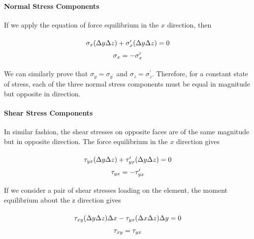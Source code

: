 \documentclass[
10pt,
a4paper,
openany,
svgnames,
]{book} %
\begin{document}
\paragraph{Normal Stress Components}

If we apply the equation of force equilibrium in the $x$ direction, then

\begin{equation}
  \arraycolsep=1.4pt\def\arraystretch{1.5}
  \begin{array}{c}
    \sigma_x(\Delta y\Delta z) + \sigma_x^\prime(\Delta y\Delta z) = 0\\
    \sigma_x =  - \sigma_x^\prime
  \end{array}
\end{equation}

We can similarly prove that $\sigma_y = \sigma_{y ^\prime}$ and $\sigma_z = \sigma_z ^\prime$. Therefore, for a constant state of stress, each of the three normal stress components must be equal in magnitude but opposite in direction.

\paragraph{Shear Stress Components}

In similar fashion, the shear stresses on opposite faces are of the same magnitude but in opposite direction.
The force equilibrium in the $x$ direction gives

\begin{equation}
  \arraycolsep=1.4pt\def\arraystretch{1.5}
  \begin{array}{c}
    {\tau _{yx}}(\Delta y\Delta z) + {\tau_{yx}^\prime}(\Delta y\Delta z) = 0\\
    {\tau _{yx}} =  - {\tau_{yx}^\prime}
  \end{array}
\end{equation}

If we consider a pair of shear stresses loading on the element, the moment equilibrium about the z direction gives

\begin{equation}
  \arraycolsep=1.4pt\def\arraystretch{1.5}
  \begin{array}{c}
    {\tau _{xy}}(\Delta y\Delta z)\Delta x - {\tau _{yx}}(\Delta x\Delta z)\Delta y = 0\\
    {\tau _{xy}} = {\tau _{yx}}
  \end{array}
\end{equation}
\end{document}
